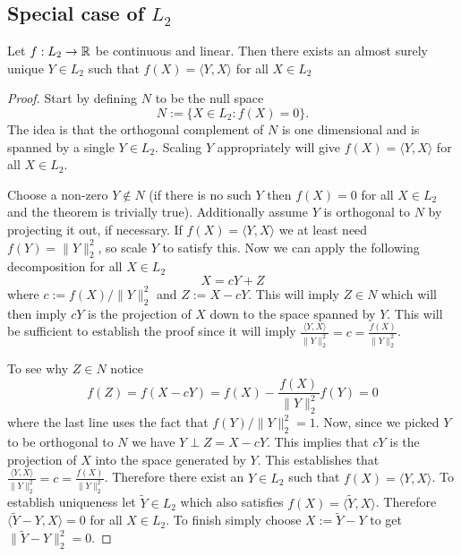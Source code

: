 \subsection{Special case of $L_2$}

\begin{theorem} 
\label{thm: riesz}
Let $f:L_2\rightarrow \Bbb R$ be continuous and linear. Then there exists an almost surely unique $Y\in L_2$ such that $f(X) = \langle Y, X\rangle$ for all $X\in L_2$
\end{theorem}
\begin{proof}
Start by defining $N$ to be the null space
\[  
N:= \{X\in L_2\colon f(X) = 0\}.
\]
The idea is that the orthogonal complement of $N$ is one dimensional and is spanned by a single $Y\in L_2$. Scaling $Y$ appropriately will give $f(X) = \langle Y, X\rangle$ for all $X\in L_2$.

Choose a non-zero $Y\notin N$  (if there is no such $Y$ then $f(X)=0$ for all $X\in L_2$ and the theorem is trivially true). Additionally assume $Y$ is orthogonal to $N$ by projecting it out, if necessary. If $f(X) = \langle Y, X\rangle$ we at least need $f(Y) = \| Y\|_2^2$, so scale $Y$ to satisfy this. Now we can apply the following decomposition for all $X\in L_2$
\begin{equation}
X = cY + Z
\end{equation}
where $c := f(X)/ \| Y \|_2^2$ and $Z := X - cY$. This will imply $Z\in N$ which will then imply $cY$ is the projection of $X$ down to the space spanned by $Y$. This will be sufficient to establish the proof since it will imply $\frac{\langle Y, X \rangle}{\| Y\|_2^2} = c = \frac{f(X)}{ \| Y \|_2^2}$.

To see why $Z\in N$ notice 
\[f(Z) = f(X - cY) = f(X) - \textstyle\frac{f(X)}{\,\| Y\|_2^2} f(Y) = 0 \]
where the last line uses the fact that $f(Y)/\| Y\|_2^2 = 1$. Now, since we picked $Y$ to be orthogonal to $N$ we have $Y \perp Z = X - cY $. This implies that $cY$ is the projection of $X$ into the space generated by $Y$. This establishes that $\frac{\langle Y, X \rangle}{\| Y\|_2^2} = c = \frac{f(X)}{ \| Y \|_2^2}$. Therefore there exist an $Y\in L_2$ such that $f(X) = \langle Y, X\rangle$. To establish uniqueness let $\widetilde Y\in L_2$ which also satisfies $f(X) = \langle \widetilde Y, X\rangle $. Therefore $\langle \widetilde Y - Y, X \rangle=0$ for all $X\in L_2$. To finish simply choose $X :=\widetilde Y - Y $ to get $\| \widetilde Y - Y\|_2^2 = 0$.

\end{proof}





